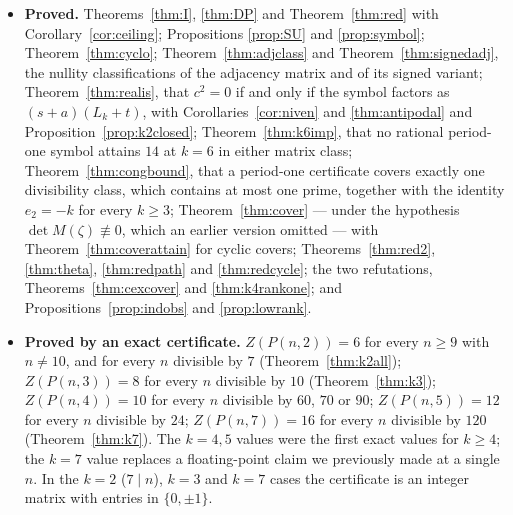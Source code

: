 \documentclass[11pt]{article}
\theoremstyle{definition}
\begin{document}
\begin{itemize}
\item \textbf{Proved.} Theorems~\ref{thm:I}, \ref{thm:DP} and
Theorem~\ref{thm:red} with Corollary~\ref{cor:ceiling}; Propositions
\ref{prop:SU} and \ref{prop:symbol}; Theorem~\ref{thm:cyclo};
Theorem~\ref{thm:adjclass} and Theorem~\ref{thm:signedadj}, the nullity
classifications of the adjacency matrix and of its signed variant;
Theorem~\ref{thm:realis}, that $c^{2}=0$ if and only if the symbol factors as
$(s+a)(L_k+t)$, with Corollaries~\ref{cor:niven} and \ref{thm:antipodal} and
Proposition~\ref{prop:k2closed}; Theorem~\ref{thm:k6imp}, that no rational
period-one symbol attains $14$ at $k=6$ in either matrix class;
Theorem~\ref{thm:congbound}, that a period-one certificate covers exactly one
divisibility class, which contains at most one prime, together with the identity
$e_2=-k$ for every $k\ge3$; Theorem~\ref{thm:cover} --- under the hypothesis
$\det M(\zeta)\not\equiv0$, which an earlier version omitted --- with
Theorem~\ref{thm:coverattain} for cyclic covers; Theorems~\ref{thm:red2},
\ref{thm:theta}, \ref{thm:redpath} and \ref{thm:redcycle}; the two refutations,
Theorems~\ref{thm:cexcover} and \ref{thm:k4rankone}; and
Propositions~\ref{prop:indobs} and \ref{prop:lowrank}.

\item \textbf{Proved by an exact certificate.} $Z(P(n,2))=6$ for every $n\ge9$
with $n\ne10$, and for every $n$ divisible by $7$ (Theorem~\ref{thm:k2all});
$Z(P(n,3))=8$ for every $n$ divisible by $10$ (Theorem~\ref{thm:k3});
$Z(P(n,4))=10$ for every $n$ divisible by $60$, $70$ or $90$;
$Z(P(n,5))=12$ for every $n$ divisible by $24$; $Z(P(n,7))=16$ for every $n$
divisible by $120$ (Theorem~\ref{thm:k7}). The $k=4,5$ values were the first
exact values for $k\ge4$; the $k=7$ value replaces a floating-point claim we
previously made at a single $n$. In the $k=2$ ($7\mid n$), $k=3$ and $k=7$ cases
the certificate is an integer matrix with entries in $\{0,\pm1\}$.


\end{itemize}
\end{document}
